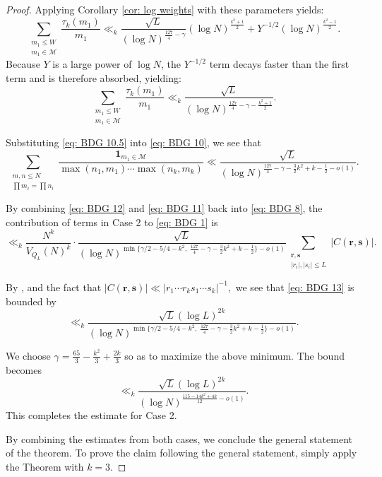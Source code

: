 \documentclass[12pt]{amsart}
\renewcommand{\leq}{\leqslant}
\numberwithin{equation}{section}
\theoremstyle{plain}
\theoremstyle{definition}
\newcommand{\CM}{\mathcal{M}}
\begin{document}
\begin{proof}
		Applying Corollary \ref{cor: log weights} with these parameters yields:
		$$ \sum_{\substack{m_1 \leq W \\ m_1 \in \CM}} \frac{\tau_k(m_1)}{m_1} \ll_k \frac{\sqrt{L}}{(\log N)^{\frac{127}{4} - \gamma}} (\log N)^{\frac{k^2+1}{2}} + Y^{-1/2} (\log N)^{\frac{k^2-1}{2}}. $$
		Because $Y$ is a large power of $\log N$, the $Y^{-1/2}$ term decays faster than the first term and is therefore absorbed, yielding:
		\begin{equation}\label{eq: BDG 10.5}
			\sum_{\substack{m_1 \leq W \\ m_1 \in \CM}} \frac{\tau_k(m_1)}{m_1} \ll_k \frac{\sqrt{L}}{(\log N)^{\frac{127}{4} - \gamma - \frac{k^2+1}{2}}}.
		\end{equation}
		
		Substituting \eqref{eq: BDG 10.5} into \eqref{eq: BDG 10}, we see that 
		\begin{equation}\label{eq: BDG 11}
			\sum_{\substack{m,n \leq N\\ \prod m_i=\prod n_i}}  \frac{\bm{1}_{m_1 \in \CM}}{\max(n_1,m_1) \cdots \max(n_k,m_k)} \ll\frac{\sqrt{L}}{(\log N)^{\frac{127}{4} - \gamma - \frac{3}{2}k^2 +k -\frac{1}{2} -o(1)}}.
		\end{equation}
		
		By combining \eqref{eq: BDG 12} and \eqref{eq: BDG 11} back into \eqref{eq: BDG 8}, the contribution of terms in Case 2 to \eqref{eq: BDG 1} is 
		\begin{equation}\label{eq: BDG 13}
			\ll_k \frac{N^k}{V_{Q_L}(N)^k} \cdot \frac{\sqrt{L}}{(\log N)^{\min\{\gamma/2-5/4 -k^2, \; \frac{127}{4} - \gamma-\frac{3}{2}k^2+k-\frac{1}{2}\}-o(1)}}\sum_{\substack{\bm{r},\bm{s} \\ |r_i|,|s_i| \leq L}}|C(\bm{r,s})|. 
		\end{equation}
		
		By , and the fact that $|C(\bm{r,s})| \ll |r_1\cdots r_k s_1\cdots s_k|^{-1},$ we see that \eqref{eq: BDG 13} is bounded by
		$$\ll_k \frac{\sqrt{L}(\log L)^{2k}}{(\log N)^{\min\{\gamma/2-5/4 -k^2, \; \frac{127}{4} - \gamma-\frac{3}{2}k^2+k-\frac{1}{2}\}-o(1)}}.$$
		
		We choose $\gamma = \frac{65}{3} - \frac{k^2}{3}+\frac{2k}{3}$ so as to maximize the above minimum. The bound becomes
		$$\ll_k \frac{\sqrt{L}(\log L)^{2k}}{(\log N)^{\frac{115 - 14k^2 + 4k}{12} - o(1)}}.$$
		This completes the estimate for Case 2.
		
		By combining the estimates from both cases, we conclude the general statement of the theorem. To prove the claim following the general statement, simply apply the Theorem with $ k = 3$. 
	\end{proof}
\end{document}
